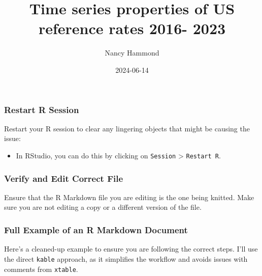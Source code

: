 \documentclass[
]{article}
\title{Time series properties of US reference rates 2016- 2023}
\author{Nancy Hammond}
\date{2024-06-14}
\providecommand{\tightlist}{%
  \setlength{\itemsep}{0pt}\setlength{\parskip}{0pt}}
\begin{document}
\maketitle

{
\setcounter{tocdepth}{2}
\tableofcontents
}
\hypertarget{restart-r-session}{%
\subsubsection{Restart R Session}\label{restart-r-session}}

Restart your R session to clear any lingering objects that might be causing the issue:

\begin{itemize}
\tightlist
\item
  In RStudio, you can do this by clicking on \texttt{Session} \textgreater{} \texttt{Restart\ R}.
\end{itemize}

\hypertarget{verify-and-edit-correct-file}{%
\subsubsection{Verify and Edit Correct File}\label{verify-and-edit-correct-file}}

Ensure that the R Markdown file you are editing is the one being knitted. Make sure you are not editing a copy or a different version of the file.

\hypertarget{full-example-of-an-r-markdown-document}{%
\subsubsection{Full Example of an R Markdown Document}\label{full-example-of-an-r-markdown-document}}

Here's a cleaned-up example to ensure you are following the correct steps. I'll use the direct \texttt{kable} approach, as it simplifies the workflow and avoids issues with comments from \texttt{xtable}.
\end{document}
